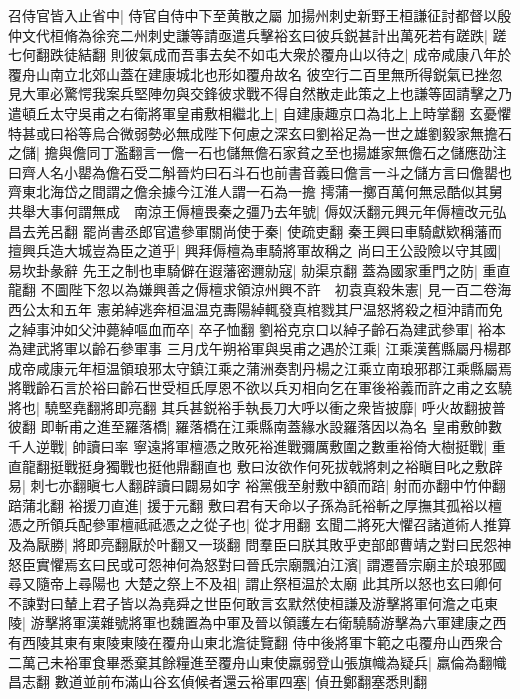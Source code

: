召侍官皆入止省中|{
	侍官自侍中下至黄散之屬}
加揚州刺史新野王桓謙征討都督以殷仲文代桓脩為徐兖二州刺史謙等請亟遣兵擊裕玄曰彼兵鋭甚計出萬死若有蹉跌|{
	蹉七何翻跌徒結翻}
則彼氣成而吾事去矣不如屯大衆於覆舟山以待之|{
	成帝咸康八年於覆舟山南立北郊山蓋在建康城北也形如覆舟故名}
彼空行二百里無所得鋭氣已挫忽見大軍必驚愕我案兵堅陣勿與交鋒彼求戰不得自然散走此策之上也謙等固請擊之乃遣頓丘太守吳甫之右衛將軍皇甫敷相繼北上|{
	自建康趣京口為北上上時掌翻}
玄憂懼特甚或曰裕等烏合微弱勢必無成陛下何慮之深玄曰劉裕足為一世之雄劉毅家無擔石之儲|{
	擔與儋同丁濫翻言一儋一石也儲無儋石家貧之至也揚雄家無儋石之儲應劭注曰齊人名小罌為儋石受二斛晉灼曰石斗石也前書音義曰儋言一斗之儲方言曰儋罌也齊東北海岱之間謂之儋余據今江淮人謂一石為一擔}
摴蒲一擲百萬何無忌酷似其舅共舉大事何謂無成　南涼王傉檀畏秦之彊乃去年號|{
	傉奴沃翻元興元年傉檀改元弘昌去羌呂翻}
罷尚書丞郎官遣參軍關尚使于秦|{
	使疏吏翻}
秦王興曰車騎獻欵稱藩而擅興兵造大城豈為臣之道乎|{
	興拜傉檀為車騎將軍故稱之}
尚曰王公設險以守其國|{
	易坎卦彖辭}
先王之制也車騎僻在遐藩密邇勍寇|{
	勍渠京翻}
蓋為國家重門之防|{
	重直龍翻}
不圖陛下忽以為嫌興善之傉檀求領涼州興不許　初袁真殺朱憲|{
	見一百二卷海西公太和五年}
憲弟綽逃奔桓温温克夀陽綽輒發真棺戮其尸温怒將殺之桓沖請而免之綽事沖如父沖薨綽嘔血而卒|{
	卒子恤翻}
劉裕克京口以綽子齡石為建武參軍|{
	裕本為建武將軍以齡石參軍事}
三月戊午朔裕軍與吳甫之遇於江乘|{
	江乘漢舊縣屬丹楊郡成帝咸康元年桓温領琅邪太守鎮江乘之蒲洲奏割丹楊之江乘立南琅邪郡江乘縣屬焉}
將戰齡石言於裕曰齡石世受桓氏厚恩不欲以兵刃相向乞在軍後裕義而許之甫之玄驍將也|{
	驍堅堯翻將即亮翻}
其兵甚鋭裕手執長刀大呼以衝之衆皆披靡|{
	呼火故翻披普彼翻}
即斬甫之進至羅落橋|{
	羅落橋在江乘縣南蓋緣水設羅落因以為名}
皇甫敷帥數千人逆戰|{
	帥讀曰率}
寧遠將軍檀憑之敗死裕進戰彌厲敷圍之數重裕倚大樹挺戰|{
	重直龍翻挺戰挺身獨戰也挺他鼎翻直也}
敷曰汝欲作何死拔戟將刺之裕瞋目叱之敷辟易|{
	刺七亦翻瞋七人翻辟讀曰闢易如字}
裕黨俄至射敷中額而踣|{
	射而亦翻中竹仲翻踣蒲北翻}
裕援刀直進|{
	援于元翻}
敷曰君有天命以子孫為託裕斬之厚撫其孤裕以檀憑之所領兵配參軍檀祗祗憑之之從子也|{
	從才用翻}
玄聞二將死大懼召諸道術人推算及為厭勝|{
	將即亮翻厭於叶翻又一琰翻}
問羣臣曰朕其敗乎吏部郎曹靖之對曰民怨神怒臣實懼焉玄曰民或可怨神何為怒對曰晉氏宗廟飄泊江濱|{
	謂遷晉宗廟主於琅邪國尋又隨帝上尋陽也}
大楚之祭上不及祖|{
	謂止祭桓温於太廟}
此其所以怒也玄曰卿何不諫對曰輦上君子皆以為堯舜之世臣何敢言玄默然使桓謙及游擊將軍何澹之屯東陵|{
	游擊將軍漢雜號將軍也魏置為中軍及晉以領護左右衛驍騎游擊為六軍建康之西有西陵其東有東陵東陵在覆舟山東北澹徒覽翻}
侍中後將軍卞範之屯覆舟山西衆合二萬己未裕軍食畢悉棄其餘糧進至覆舟山東使羸弱登山張旗幟為疑兵|{
	羸倫為翻幟昌志翻}
數道並前布滿山谷玄偵候者還云裕軍四塞|{
	偵丑鄭翻塞悉則翻}
